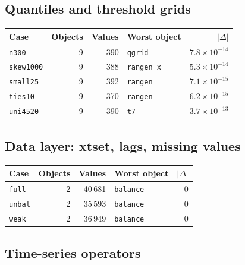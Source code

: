 \documentclass[10.5pt,a4paper]{article}
\begin{document}
\subsection*{Quantiles and threshold grids}

\begin{longtable}{@{}p{3.6cm}rrp{4.9cm}r@{}}
\toprule
Case & Objects & Values & Worst object & $|\Delta|$ \\
\midrule
\endhead
\texttt{n300} & 9 & 390 & \texttt{qgrid} & $7.8\times10^{-14}$ \\
\texttt{skew1000} & 9 & 388 & \texttt{rangen\_\allowbreak{}x} & $5.3\times10^{-14}$ \\
\texttt{small25} & 9 & 392 & \texttt{rangen} & $7.1\times10^{-15}$ \\
\texttt{ties10} & 9 & 370 & \texttt{rangen} & $6.2\times10^{-15}$ \\
\texttt{uni4520} & 9 & 390 & \texttt{t7} & $3.7\times10^{-13}$ \\
\bottomrule
\end{longtable}

\subsection*{Data layer: xtset, lags, missing values}

\begin{longtable}{@{}p{3.6cm}rrp{4.9cm}r@{}}
\toprule
Case & Objects & Values & Worst object & $|\Delta|$ \\
\midrule
\endhead
\texttt{full} & 2 & 40\,681 & \texttt{balance} & 0 \\
\texttt{unbal} & 2 & 35\,593 & \texttt{balance} & 0 \\
\texttt{weak} & 2 & 36\,949 & \texttt{balance} & 0 \\
\bottomrule
\end{longtable}

\subsection*{Time-series operators}
\end{document}
